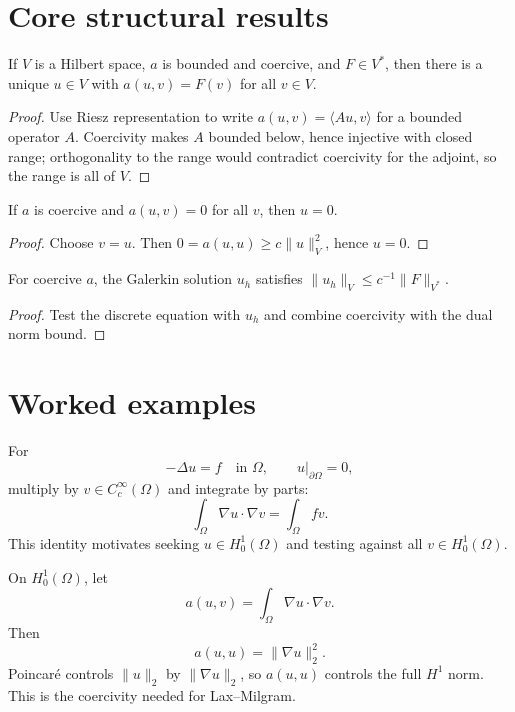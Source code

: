 \section{Core structural results}

\begin{theorem}\label{thm:iii23-01}
If $V$ is a Hilbert space, $a$ is bounded and coercive, and $F\in V^*$, then there is a unique $u\in V$ with $a(u,v)=F(v)$ for all $v\in V$.
\begin{proof}
Use Riesz representation to write $a(u,v)=\langle Au,v\rangle$ for a bounded operator $A$. Coercivity makes $A$ bounded below, hence injective with closed range; orthogonality to the range would contradict coercivity for the adjoint, so the range is all of $V$.
\end{proof}
\end{theorem}

\begin{theorem}\label{thm:iii23-02}
If $a$ is coercive and $a(u,v)=0$ for all $v$, then $u=0$.
\begin{proof}
Choose $v=u$. Then $0=a(u,u)\ge c\|u\|_V^2$, hence $u=0$.
\end{proof}
\end{theorem}

\begin{theorem}\label{thm:iii23-03}
For coercive $a$, the Galerkin solution $u_h$ satisfies $\|u_h\|_V\le c^{-1}\|F\|_{V^*}$.
\begin{proof}
Test the discrete equation with $u_h$ and combine coercivity with the dual norm bound.
\end{proof}
\end{theorem}

\section{Worked examples}

\begin{example}\label{ex:iii23-worked-01}
For
\[
-\Delta u=f\quad\text{in }\Omega,\qquad u|_{\partial\Omega}=0,
\]
multiply by \(v\in C_c^\infty(\Omega)\) and integrate by parts:
\[
\int_\Omega\nabla u\cdot\nabla v
=\int_\Omega fv.
\]
This identity motivates seeking \(u\in H_0^1(\Omega)\) and testing against all
\(v\in H_0^1(\Omega)\).
\end{example}

\begin{example}\label{ex:iii23-worked-02}
On \(H_0^1(\Omega)\), let
\[
a(u,v)=\int_\Omega\nabla u\cdot\nabla v.
\]
Then
\[
a(u,u)=\|\nabla u\|_2^2.
\]
Poincaré controls \(\|u\|_2\) by \(\|\nabla u\|_2\), so \(a(u,u)\) controls the
full \(H^1\) norm. This is the coercivity needed for Lax--Milgram.
\end{example}

